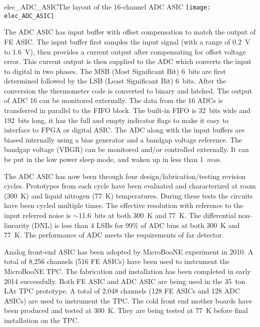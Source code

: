 \begin{cdrfigure}{elec_ADC_ASIC}{The layout of the 16-channel ADC ASIC}
\texttt{[image: elec\_ADC\_ASIC]} %
\end{cdrfigure}

The ADC ASIC has input buffer with offset compensation to match the output of FE ASIC.
The input buffer first samples the input signal (with a range of 0.2~V to 1.6~V),
then provides a current output after compensating for offset voltage error.
This current output is then supplied to the ADC which converts the input to digital in two phases.
The MSB (Most Significant Bit) 6~bits are first determined followed by the LSB (Least Significant Bit) 6~bits.
After the conversion the thermometer code is converted to binary and latched.
The output of ADC 16 can be monitored externally.
The data from the 16 ADCs is transferred in parallel to the FIFO block.
The built-in FIFO is 32~bits wide and 192~bits long,
it has the full and empty indicator flags to make it easy to interface to FPGA or digital ASIC.
The ADC along with the input buffers are biased internally using a bias generator and a bandgap voltage reference.
The bandgap voltage (VBGR) can be monitored and/or controlled externally.
It can be put in the low power sleep mode, and waken up in less than 1~$mu$s.

The ADC ASIC has now been through four design/fabrication/testing revision cycles.
Prototypes from each cycle have been evaluated and characterized at room (300~K) and liquid nitrogen (77~K) temperatures.
During these tests the circuits have been cycled multiple times.
The effective resolution with reference to the input referred noise is $\sim$11.6~bits at both 300~K and 77~K.
The differential non-linearity (DNL) is less than 4 LSBs for 99\% of ADC bins at both 300~K and 77~K.
The performance of ADC meets the requirements of far detector.

Analog front-end ASIC has been adopted by MicroBooNE experiment in 2010.
A total of 8,256 channels (516 FE ASICs) have been used to instrument the MicroBooNE TPC.
The fabrication and installation has been completed in early 2014 successfully.
Both FE ASIC and ADC ASIC are being used in the 35~ton LAr TPC prototype.
A total of 2,048 channels (128 FE ASICs and 128 ADC ASICs) are used to instrument the TPC.
The cold front end mother boards have been produced and tested at 300~K.
They are being tested at 77~K before final installation on the TPC.


%
